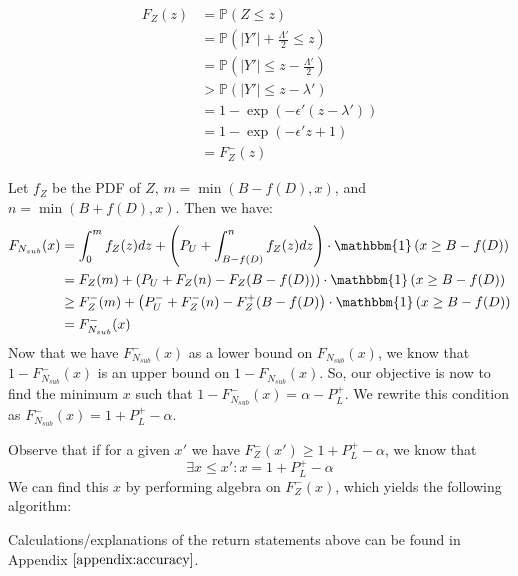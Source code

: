 \documentclass[11pt]{scrartcl} %
\begin{document}
\begin{align}
	F_{Z}(z) &= \mathbb{P}(Z \leq z) \nonumber \\
			 &= \mathbb{P}\left( \vert Y' \vert + \frac{\Lambda'}{2} \leq z \right) \nonumber \\
			 &= \mathbb{P} \left( \vert Y' \vert \leq z - \frac{\Lambda'}{2} \right) \nonumber \\
			 &> \mathbb{P} \left( \vert Y' \vert \leq z - \lambda' \right) \nonumber \\
			 &= 1 - \exp\left( -\epsilon'(z - \lambda') \right) \nonumber \\
			 &= 1 - \exp\left( -\epsilon'z + 1 \right) \nonumber \\
			 &= F_{Z}^{-}(z) \nonumber
\end{align}

Let $f_Z$ be the PDF of $Z$, $m = \min\left(B-f(D),x\right)$, and $n = \min\left(B+f(D),x\right)$.  Then we have:
\begin{align}
	F_{N_{sub}}(x) &= \int_{0}^{m} f_{Z}(z)dz + \left( P_{U} + \int_{B - f(D)}^{n} f_{Z}(z)dz \right) \cdot \mathbbm{1}\left(x \geq B - f(D)\right) \nonumber \\
				   &= F_{Z}(m) + \left( P_{U}  + F_{Z}(n) - F_{Z}(B - f(D)) \right) \cdot \mathbbm{1}\left( x \geq B - f(D) \right)   \nonumber \\
				   &\geq F_{Z}^{-}(m) + \left( P_{U}^{-} + F_{Z}^{-}(n) - F_{Z}^{+}(B - f(D) \right) \cdot \mathbbm{1}\left(x \geq B - f(D)\right) \nonumber \\
				   &= F_{N_{sub}}^{-}(x) \nonumber
\end{align}
Now that we have $F_{N_{sub}}^{-}(x)$ as a lower bound on $F_{N_{sub}}(x)$, we know that
$1 - F_{N_{sub}}^{-}(x)$ is an upper bound on $1 - F_{N_{sub}}(x)$.
So, our objective is now to find the minimum $x$ such that $1 - F_{N_{sub}}^{-}(x) = \alpha - P_{L}^{+}$.
We rewrite this condition as $F_{N_{sub}}^{-}(x) = 1 + P_{L}^{+} - \alpha$. \newline

Observe that if for a given $x'$ we have
$F_{Z}^{-}(x') \geq 1 + P_{L}^{+} - \alpha$, we know that
\[ \exists x \leq x': x = 1 + P_{L}^{+} - \alpha \]
We can find this $x$ by performing algebra on $F_{Z}^{-}(x)$, which yields the following algorithm:

\begin{algorithm}
	\label{GetAccuracy}
	\begin{algorithmic}
				\State{}
				\State{}
				\State{}
			\Else{}
				\State{}
			\EndIf
		\EndFunction
	\end{algorithmic}
\end{algorithm}
Calculations/explanations of the return statements above can be found in Appendix $\autoref{appendix:accuracy}$. \newline
\end{document}
